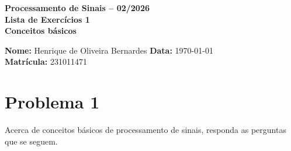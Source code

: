 \documentclass[12pt,a4paper]{article}
\begin{document}
\begin{center}
  {\sffamily\bfseries\large\color{unbblue} Processamento de Sinais -- 02/2026}\\[2.2em]
  {\sffamily\bfseries\large\color{unbblue} Lista de Exercícios 1}\\[0.8em]
  {\sffamily\bfseries\large\color{unbblue} Conceitos básicos}
\end{center}

\vspace{0.5em}
\noindent\textbf{Nome:} Henrique de Oliveira Bernardes \hfill \textbf{Data:} \today\\
\textbf{Matrícula:} 231011471

 

\section{Problema 1}
Acerca de conceitos básicos de processamento de sinais, responda as perguntas que se seguem.
\end{document}
